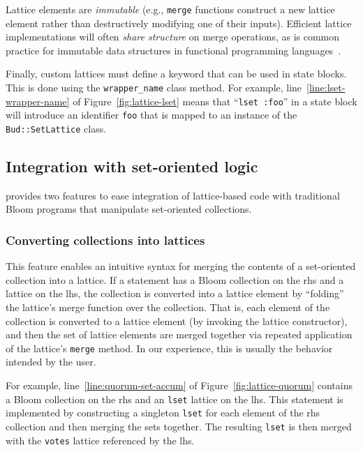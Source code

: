 Lattice elements are \emph{immutable} (e.g., \texttt{merge} functions construct
a new lattice element rather than destructively modifying one of their
inputs). Efficient lattice implementations will often \emph{share structure} on merge
operations, as is common practice for immutable data structures in functional
programming languages~\cite{Okasaki1999}. %

Finally, custom lattices must define a keyword that can be used in \lang state
blocks. This is done using the \texttt{wrapper\_name} class method. For example,
line~\ref{line:lset-wrapper-name} of Figure~\ref{fig:lattice-lset} means that
``\texttt{lset :foo}'' in a \lang state block will introduce an identifier
\texttt{foo} that is mapped to an instance of the \texttt{Bud::SetLattice}
class.

\subsection{Integration with set-oriented logic}
\label{sec:bloom-interop}
\lang provides two features to ease integration of lattice-based code with
traditional Bloom programs that manipulate set-oriented collections.

\subsubsection{Converting collections into lattices}
This feature enables an intuitive syntax for merging the contents of a
set-oriented collection into a lattice. If a statement has a Bloom collection on
the rhs and a lattice on the lhs, the collection is converted into a lattice
element by ``folding'' the lattice's merge function over the collection. That
is, each element of the collection is converted to a lattice element (by
invoking the lattice constructor), and then the set of lattice elements are
merged together via repeated application of the lattice's \texttt{merge}
method. In our experience, this is usually the behavior intended by the user.

For example, line~\ref{line:quorum-set-accum} of Figure~\ref{fig:lattice-quorum}
contains a Bloom collection on the rhs and an \texttt{lset} lattice on the
lhs. This statement is implemented by constructing a singleton \texttt{lset} for
each element of the rhs collection and then merging the sets together. The
resulting \texttt{lset} is then merged with the \texttt{votes} lattice
referenced by the lhs.

